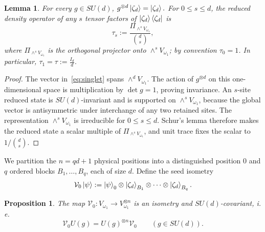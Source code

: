 \documentclass[10pt,twocolumn,superscriptaddress,aps,amsmath,amssymb,citeautoscript,floatfix,prx]{revtex4-2}
\theoremstyle{plain}
\theoremstyle{plain}
\theoremstyle{plain}
\theoremstyle{plain}
\theoremstyle{plain}
\theoremstyle{plain}
\theoremstyle{plain}
\newtheorem{smproposition}[smtheorem]{Proposition}
\newtheorem{smlemma}[smtheorem]{Lemma}
\theoremstyle{definition}
\theoremstyle{plain}
\begin{document}
\begin{appendix}
\begin{smlemma}
\label{lem:singlet-red-states}
For every $g\in SU(d)$,
$
  g^{\otimes d}\ket{\zeta_d}=\ket{\zeta_d}.
$
For $0\le s\le d$, the reduced density operator of any $s$ tensor factors of $\ket{\zeta_d}\bra{\zeta_d}$ is
\begin{equation}
\label{eq:tau-s}
  \tau_s
  :=\frac{\Pi_{\wedge^sV_{\omega_1}}}{\binom ds},
\end{equation}
where $\Pi_{\wedge^sV_{\omega_1}}$ is the orthogonal projector onto $\wedge^sV_{\omega_1}$; by convention $\tau_0=1$. In particular,
$
  \tau_1=\tau:=\frac{I_d}{d}.
$
\end{smlemma}
\begin{proof}
The vector in~\eqref{eq:singlet} spans $\wedge^dV_{\omega_1}$.  
The action of $g^{\otimes d}$ on this one-dimensional space is multiplication by $\det g=1$, proving invariance. 
An $s$-site reduced state is $SU(d)$-invariant and is supported on $\wedge^sV_{\omega_1}$, because the global vector is antisymmetric under interchange of any two retained sites.  
The representation $\wedge^sV_{\omega_1}$ is irreducible for $0\le s\le d$.  
Schur's lemma therefore makes the reduced state a scalar multiple of $\Pi_{\wedge^sV_{\omega_1}}$, and unit trace fixes the scalar to $1/\binom ds$.
\end{proof}

We partition the $n=qd+1$ physical positions into a distinguished position $0$ and $q$ ordered blocks $B_1,\ldots,B_q$, each of size $d$.  
Define the seed isometry
\begin{equation}
\label{eq:seed-isometry}
  \mathcal{V}_0\ket\psi
  :=\ket\psi_0\otimes\ket{\zeta_d}_{B_1}\otimes\cdots\otimes\ket{\zeta_d}_{B_q}.
\end{equation}

\begin{smproposition}
\label{prop:seed-covariance}
The map $\mathcal{V}_0:V_{\omega_1}\to V_{\omega_1}^{\otimes n}$ is an isometry and $SU(d)$-covariant, i. e.
\[
  \mathcal{V}_0U(g)=U(g)^{\otimes n}\mathcal{V}_0
  \qquad(g\in SU(d)).
\]
\end{smproposition}


\end{appendix}
\end{document}
